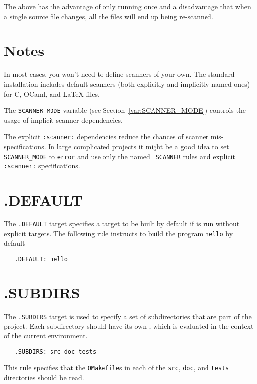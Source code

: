 The above has the advantage of only running  once and a disadvantage that when a single
source file changes, all the files will end up being re-scanned.

\section{Notes}

In most cases, you won't need to define scanners of your own.  The standard installation includes
default scanners (both explicitly and implicitly named ones) for C, OCaml, and \LaTeX{} files.

The \verb+SCANNER_MODE+ variable (see Section~\ref{var:SCANNER_MODE}) controls the usage of implicit scanner dependencies.

The explicit \verb+:scanner:+ dependencies reduce the chances of scanner mis-specifications. In
large complicated projects it might be a good idea to set \verb+SCANNER_MODE+ to \verb+error+ and
use only the named \verb+.SCANNER+ rules and explicit \verb+:scanner:+ specifications.

\section{.DEFAULT}

The \verb+.DEFAULT+ target specifies a target to be built by default
if  is run without explicit targets.  The following rule
instructs  to build the program \verb+hello+ by default

\begin{verbatim}
   .DEFAULT: hello
\end{verbatim}

\section{.SUBDIRS}

The \verb+.SUBDIRS+ target is used to specify a set of subdirectories
that are part of the project.  Each subdirectory should have its own
, which is evaluated in the context of the current
environment.

\begin{verbatim}
   .SUBDIRS: src doc tests
\end{verbatim}

This rule specifies that the \verb+OMakefile+s in each of the \verb+src+, \verb+doc+, and
\verb+tests+ directories should be read.

